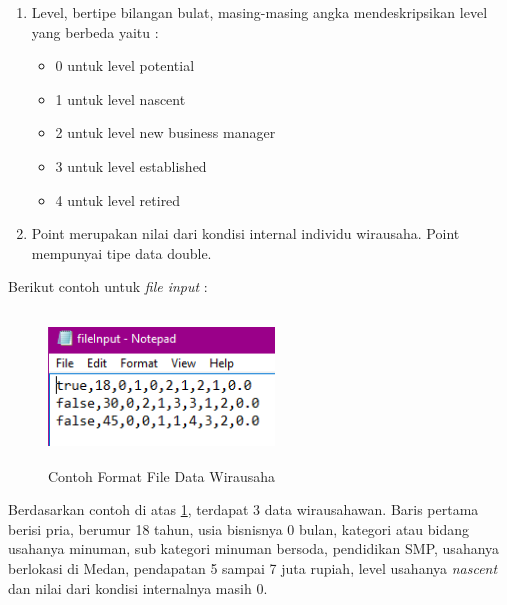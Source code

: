 \begin{enumerate}
			\begin{itemize}
			\item 0 untuk pendapatan dibawah 3 juta rupiah
			\item 1 untuk pendapatan 3 juta rupiah sampai 5 juta rupiah
			\item 2 untuk pendapatan 5 juta rupiah sampai 7 juta rupiah
			\item 3 untuk pendapatan 7 juta rupiah sampai 9 juta rupiah
			\item 4 untuk pendapatan 9 juta rupiah sampai 11 juta rupiah
			\item 5 untuk pendapatan 11 juta rupiah sampai 13 juta rupiah
			\item 6 untuk pendapatan 13 juta rupiah sampai 15 juta rupiah
			\item 7 untuk pendapatan diatas 15 juta rupiah
			\end{itemize}
		\item Level, bertipe bilangan bulat, masing-masing angka mendeskripsikan level yang berbeda yaitu :
			\begin{itemize}
			\item 0 untuk level potential
			\item 1 untuk level nascent
			\item 2 untuk level new business manager
			\item 3 untuk level established 
			\item 4 untuk level retired
			\end{itemize}
		\item Point merupakan nilai dari kondisi internal individu wirausaha. Point mempunyai tipe data double.
\end{enumerate}
Berikut contoh untuk \textit{file input} :

\begin{figure} [H]
	\centering  
	\includegraphics[width=6cm, height=4cm]{formatFile} 
	\caption[Contoh Format File Data Wirausaha]{Contoh Format File Data Wirausaha}
	\label{fig:formatFile} 
\end{figure}

Berdasarkan contoh di atas \ref{fig:formatFile}, terdapat 3 data wirausahawan. Baris pertama berisi pria, berumur 18 tahun, usia bisnisnya 0 bulan, kategori atau bidang usahanya minuman, sub kategori minuman bersoda, pendidikan SMP, usahanya berlokasi di Medan, pendapatan 5 sampai 7 juta rupiah, level usahanya \textit{nascent} dan nilai dari kondisi internalnya masih 0.
